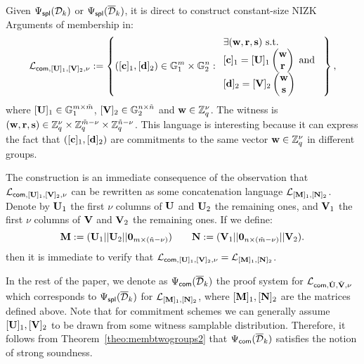Given ${\Psi_{\mathsf{spl}}(\mathcal{D}_k)}$ or ${\Psi_\mathsf{spl}(\overline{\mathcal{D}}_k)}$, it is direct to construct constant-size NIZK Arguments of membership in:
$$\mathcal{L}_{\mathsf{com},[\mathbf{{U}}]_1,[\mathbf{{V}}]_2,\nu}:=\left\{([\mathbf{c}]_1,[\mathbf{d}]_2) \in \mathbb{G}_1^{m} \times \mathbb{G}_2^{n}:
\begin{array}{l}
    \exists (\mathbf{w},\mathbf{r},\mathbf{s}) \text{ s.t. }\\
    {[\mathbf{c}]_1= [\mathbf{{U}}]_1 \begin{pmatrix} \mathbf{w}\\ \mathbf{r} \end{pmatrix} \text{ and }}\\
    {[\mathbf{d}]_2=[\mathbf{{V}}]_2 \begin{pmatrix} \mathbf{w} \\ \mathbf{s} \end{pmatrix}}
\end{array}
\right\},$$
where $[\mathbf{{U}}]_1\in \mathbb{G}_1^{m \times \tilde{m}}$, 
$[\mathbf{{V}}]_2 \in \mathbb{G}_2^{n \times \tilde{n}}$
and $\mathbf{w} \in \mathbb{Z}_q^{\nu}$. The witness is 
 $(\mathbf{w},\mathbf{r},\mathbf{s}) \in \mathbb{Z}_q^{\nu} \times \mathbb{Z}_q^{\tilde{m}-\nu} \times \mathbb{Z}_q^{\tilde{n}-\nu}$. This language is interesting because it can express the fact that 
$([\mathbf{c}]_1,[\mathbf{d}]_2)$ are commitments to the same vector 
$\mathbf{w} \in \mathbb{Z}_q^{\nu}$ in different groups.
 
The construction is an immediate consequence of the observation 
that $\mathcal{L}_{\mathsf{com},[\mathbf{{U}}]_1,[\mathbf{{V}}]_2,\nu}$  can be rewritten as some concatenation language $\mathcal{L}_{[\mathbf{{M}}]_1,[\mathbf{{N}}]_2}$.
Denote by $\mathbf{{U}}_1$ the first $\nu$ columns of $\mathbf{{U}}$  and $\mathbf{{U}}_2$ the remaining ones, and $\mathbf{{V}}_1$ the first $\nu$ columns of $\mathbf{{V}}$ and $\mathbf{{V}}_2$ the remaining ones. If we define: 
\begin{equation*}
 \mathbf{{M}} := (\mathbf{{U}}_1||\mathbf{{U}}_2||\mathbf{{0}}_{m\times (\tilde{n}-\nu)}) \qquad
\mathbf{{N}} := (\mathbf{{V}}_1||\mathbf{{0}}_{n\times (\tilde{m}- \nu)}||\mathbf{{V}}_2).
\end{equation*}
then it is immediate to verify that $\mathcal{L}_{\mathsf{com},[\mathbf{{U}}]_1,[\mathbf{{V}}]_2,\nu}=\mathcal{L}_{[\mathbf{{M}}]_1,[\mathbf{{N}}]_2}$.

In the rest of the paper, we denote as ${\Psi_{\mathsf{com}}(\overline{\mathcal{D}}_k)}$ the proof 
system for $\mathcal{L}_{\mathsf{com},{\hat{\mathbf{{U}}}},\check{\mathbf{{V}}},\nu}$ which corresponds to ${\Psi_\mathsf{spl}(\overline{\mathcal{D}}_k)}$ for $\mathcal{L}_{[\mathbf{{M}}]_1,[\mathbf{{N}}]_2}$, where $[\mathbf{{M}}]_1,[\mathbf{{N}}]_2$ are the matrices defined above. Note that for commitment schemes we can generally assume $[\mathbf{{U}}]_1,[\mathbf{{V}}]_2$ to be drawn from some witness samplable distribution. Therefore, it follows from Theorem~\ref{theo:membtwogroups2} that ${\Psi_{\mathsf{com}}(\overline{\mathcal{D}}_k)}$ satisfies the notion of strong soundness.  
